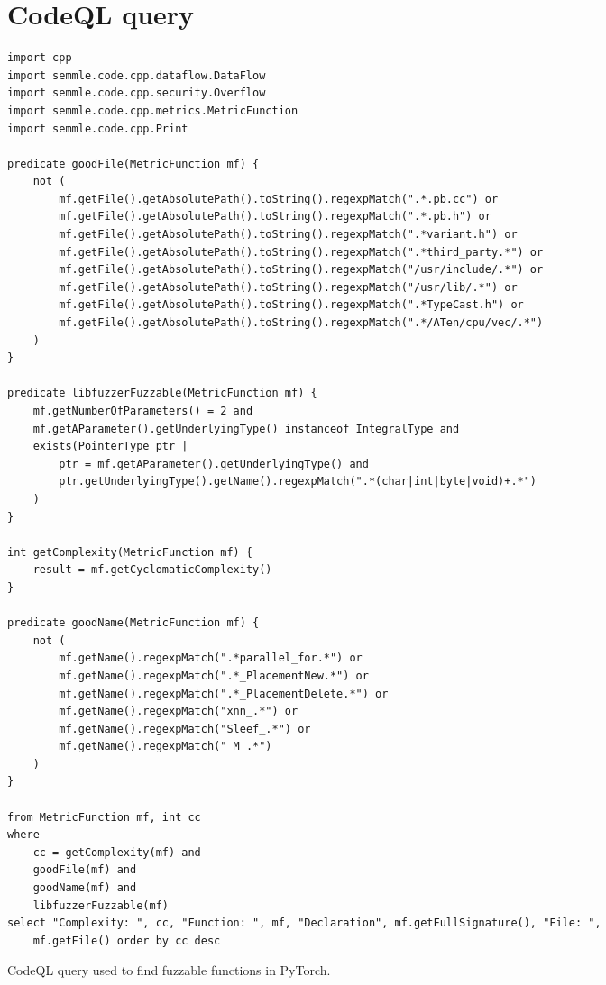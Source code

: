\appendix

\section{CodeQL query} \label{appendix:codeql-query}

\renewcommand\theFancyVerbLine{\footnotesize\arabic{FancyVerbLine}}
\newenvironment{code}{\captionsetup{type=listing}}{}

\begin{code}
    \begin{verbatim}
import cpp
import semmle.code.cpp.dataflow.DataFlow
import semmle.code.cpp.security.Overflow
import semmle.code.cpp.metrics.MetricFunction
import semmle.code.cpp.Print

predicate goodFile(MetricFunction mf) {
    not (
        mf.getFile().getAbsolutePath().toString().regexpMatch(".*.pb.cc") or
        mf.getFile().getAbsolutePath().toString().regexpMatch(".*.pb.h") or
        mf.getFile().getAbsolutePath().toString().regexpMatch(".*variant.h") or
        mf.getFile().getAbsolutePath().toString().regexpMatch(".*third_party.*") or
        mf.getFile().getAbsolutePath().toString().regexpMatch("/usr/include/.*") or
        mf.getFile().getAbsolutePath().toString().regexpMatch("/usr/lib/.*") or
        mf.getFile().getAbsolutePath().toString().regexpMatch(".*TypeCast.h") or
        mf.getFile().getAbsolutePath().toString().regexpMatch(".*/ATen/cpu/vec/.*")
    )
}

predicate libfuzzerFuzzable(MetricFunction mf) {
    mf.getNumberOfParameters() = 2 and
    mf.getAParameter().getUnderlyingType() instanceof IntegralType and
    exists(PointerType ptr |
        ptr = mf.getAParameter().getUnderlyingType() and
        ptr.getUnderlyingType().getName().regexpMatch(".*(char|int|byte|void)+.*")
    )
}

int getComplexity(MetricFunction mf) {
    result = mf.getCyclomaticComplexity()
}

predicate goodName(MetricFunction mf) {
    not (
        mf.getName().regexpMatch(".*parallel_for.*") or
        mf.getName().regexpMatch(".*_PlacementNew.*") or
        mf.getName().regexpMatch(".*_PlacementDelete.*") or
        mf.getName().regexpMatch("xnn_.*") or
        mf.getName().regexpMatch("Sleef_.*") or
        mf.getName().regexpMatch("_M_.*")
    )
}

from MetricFunction mf, int cc
where
    cc = getComplexity(mf) and
    goodFile(mf) and
    goodName(mf) and
    libfuzzerFuzzable(mf)
select "Complexity: ", cc, "Function: ", mf, "Declaration", mf.getFullSignature(), "File: ",
    mf.getFile() order by cc desc
\end{verbatim}
    \caption{CodeQL query used to find fuzzable functions in PyTorch.}
\end{code}

